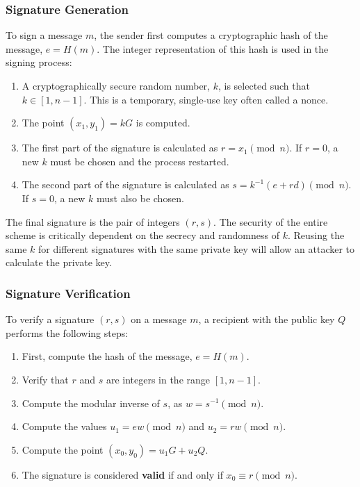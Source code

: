 \documentclass[12pt, letterpaper]{article}
\begin{document}
	\subsubsection{Signature Generation}
	To sign a message $m$, the sender first computes a cryptographic hash of the message, $e = H(m)$. The integer representation of this hash is used in the signing process:
	\begin{enumerate}
		\item A cryptographically secure random number, $k$, is selected such that $k \in [1, n-1]$. This is a temporary, single-use key often called a nonce.
		\item The point $(x_1, y_1) = kG$ is computed.
		\item The first part of the signature is calculated as $r = x_1 \pmod{n}$. If $r=0$, a new $k$ must be chosen and the process restarted.
		\item The second part of the signature is calculated as $s = k^{-1}(e + rd) \pmod{n}$. If $s=0$, a new $k$ must also be chosen.
	\end{enumerate}
	The final signature is the pair of integers $(r, s)$. The security of the entire scheme is critically dependent on the secrecy and randomness of $k$. Reusing the same $k$ for different signatures with the same private key will allow an attacker to calculate the private key.
	
	\subsubsection{Signature Verification}
	To verify a signature $(r, s)$ on a message $m$, a recipient with the public key $Q$ performs the following steps:
	\begin{enumerate}
		\item First, compute the hash of the message, $e = H(m)$.
		\item Verify that $r$ and $s$ are integers in the range $[1, n-1]$.
		\item Compute the modular inverse of $s$, as $w = s^{-1} \pmod{n}$.
		\item Compute the values $u_1 = ew \pmod{n}$ and $u_2 = rw \pmod{n}$.
		\item Compute the point $(x_0, y_0) = u_1G + u_2Q$.
		\item The signature is considered \textbf{valid} if and only if $x_0 \equiv r \pmod{n}$.
	\end{enumerate}
	
\end{document}
